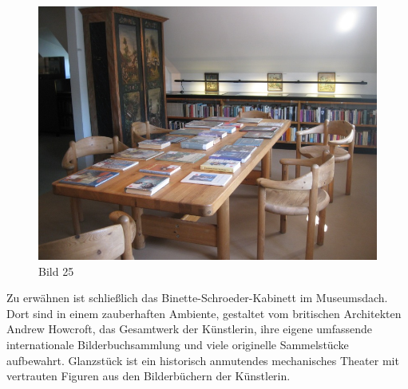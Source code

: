 \documentclass[a4paper,
fontsize=11pt,
oneside,
numbers=noperiodatend,
parskip=half-,
bibliography=totoc,
final
]{scrartcl}
\begin{document}
\begin{figure}[htbp]
\centering
\includegraphics{img/Bild25.jpg}
\caption{Bild 25}
\end{figure}

Zu erwähnen ist schließlich das Binette-Schroeder-Kabinett im
Museumsdach. Dort sind in einem zauberhaften Ambiente, gestaltet vom
britischen Architekten Andrew Howcroft, das Gesamtwerk der Künstlerin,
ihre eigene umfassende internationale Bilderbuchsammlung und viele
originelle Sammelstücke aufbewahrt. Glanzstück ist ein historisch
anmutendes mechanisches Theater mit vertrauten Figuren aus den
Bilderbüchern der Künstlerin.
\end{document}
